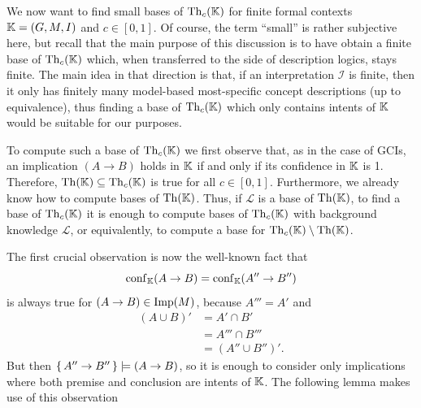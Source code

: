 We now want to find small bases of $\operatorname{Th}_c({\mathbb{K}})$ for finite formal contexts ${\mathbb{K}} =
(G, M, I)$ and $c \in [0,1]$.  Of course, the term ``small'' is rather subjective here,
but recall that the main purpose of this discussion is to have obtain a finite base of
$\operatorname{Th}_c({\mathbb{K}})$ which, when transferred to the side of description logics, stays finite.
The main idea in that direction is that, if an interpretation $\mathcal{I}$ is finite,
then it only has finitely many model-based most-specific concept descriptions (up to
equivalence), thus finding a base of $\operatorname{Th}_c({\mathbb{K}})$ which only contains intents of ${\mathbb{K}}$ would be suitable for our purposes.

To compute such a base of $\operatorname{Th}_c({\mathbb{K}})$ we first observe that, as in the case of GCIs,
an implication $(A \to B)$ holds in ${\mathbb{K}}$ if and only if its confidence in ${\mathbb{K}}$ is
1.  Therefore, $\operatorname{Th}({\mathbb{K}}) \subseteq \operatorname{Th}_c({\mathbb{K}})$ is true for all $c \in [0,1]$.
Furthermore, we already know how to compute bases of $\operatorname{Th}({\mathbb{K}})$.  Thus, if
$\mathcal{L}$ is a base of $\operatorname{Th}({\mathbb{K}})$, to find a base of $\operatorname{Th}_c({\mathbb{K}})$ it is enough
to compute bases of $\operatorname{Th}_c({\mathbb{K}})$ with background knowledge $\mathcal{L}$, or
equivalently, to compute a base for $\operatorname{Th}_c({\mathbb{K}}) \setminus \operatorname{Th}({\mathbb{K}})$.

The first crucial observation is now the well-known fact that
\begin{equation*}
  \operatorname{conf}_{{\mathbb{K}}}(A \to B) = \operatorname{conf}_{{\mathbb{K}}}(A'' \to B'')
\end{equation*}
is always true for $(A \to B) \in \operatorname{Imp}(M)$, because $A''' = A'$ and
\begin{align*}
  (A \cup B)' &= A' \cap B' \\
  &= A''' \cap B'''\\
  &= (A'' \cup B'')'.
\end{align*}
But then ${\{\, A'' \to B'' \,\}} \models (A \to B)$, so it is enough to consider only
implications where both premise and conclusion are intents of ${\mathbb{K}}$.  The following
lemma makes use of this observation

